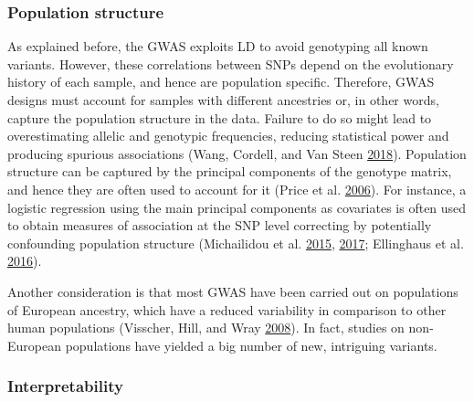 \documentclass[
  11pt,
]{env/yjiao}
\begin{document}
\hypertarget{pop-structure}{%
\subsubsection{Population structure}\label{pop-structure}}

As explained before, the GWAS exploits LD to avoid genotyping all known variants. However, these correlations between SNPs depend on the evolutionary history of each sample, and hence are population specific. Therefore, GWAS designs must account for samples with different ancestries or, in other words, capture the population structure in the data. Failure to do so might lead to overestimating allelic and genotypic frequencies, reducing statistical power and producing spurious associations (Wang, Cordell, and Van Steen \protect\hyperlink{ref-wang_statistical_2018}{2018}). Population structure can be captured by the principal components of the genotype matrix, and hence they are often used to account for it (Price et al. \protect\hyperlink{ref-price_principal_2006}{2006}). For instance, a logistic regression using the main principal components as covariates is often used to obtain measures of association at the SNP level correcting by potentially confounding population structure (Michailidou et al. \protect\hyperlink{ref-michailidou_genome-wide_2015}{2015}, \protect\hyperlink{ref-michailidou_association_2017}{2017}; Ellinghaus et al. \protect\hyperlink{ref-ellinghaus_analysis_2016}{2016}).

Another consideration is that most GWAS have been carried out on populations of European ancestry, which have a reduced variability in comparison to other human populations (Visscher, Hill, and Wray \protect\hyperlink{ref-visscher_heritability_2008}{2008}). In fact, studies on non-European populations have yielded a big number of new, intriguing variants.

\hypertarget{intro-interpretability}{%
\subsubsection{Interpretability}\label{intro-interpretability}}
\end{document}
